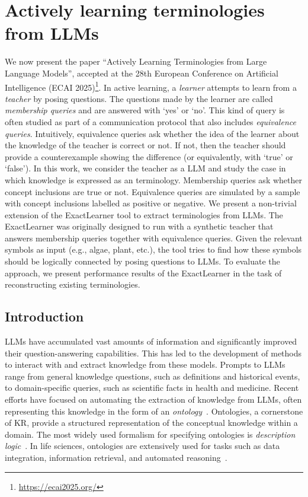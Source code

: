 \section{Actively learning \EL terminologies from \glspl{LLM}}\label{sec:actively-learning-ontologies}
%
We now present the paper ``Actively Learning \EL Terminologies from Large Language Models'', accepted at the 28th European Conference on Artificial Intelligence (ECAI 2025)\footnote{\url{https://ecai2025.org/}}.
%
In active learning, a \emph{learner} attempts to learn from a \emph{teacher} by posing questions.
%
The questions made by the learner are called \emph{membership queries} and are answered with `yes' or `no'.
%
This kind of query is often studied as part of a communication protocol that also includes \emph{equivalence queries}.
%
Intuitively, equivalence queries ask whether the idea of the learner about the knowledge of the teacher is correct or not.
%
If not, then the teacher should provide a counterexample showing the difference (or equivalently, with `true' or `false').
%
In this work, we consider the teacher as a \gls{LLM} and study the case in which knowledge is expressed as an \EL terminology.
%
Membership queries ask whether concept inclusions are true or not.
%
Equivalence queries are simulated by a sample with concept inclusions labelled as  positive or negative.
%
We present a non-trivial extension of the ExactLearner tool to extract \EL terminologies from \glspl{LLM}.
%
The ExactLearner was originally designed to run with a synthetic teacher that answers membership queries together with equivalence queries.
%
Given the relevant symbols as input (e.g., algae, plant, etc.), the tool tries to find how these symbols should be logically connected by posing questions to \glspl{LLM}.
%
To evaluate the approach, we present performance results of the ExactLearner in the task of reconstructing existing \EL terminologies.


\subsection{Introduction}
\label{subsec:actively-learning-introduction}
\glspl{LLM} have accumulated vast amounts of information and significantly improved their question-answering capabilities.
%
This has led to the development of methods to interact with and extract knowledge from these models.
%
Prompts to \glspl{LLM} range from general knowledge questions, such as definitions and historical events, to domain-specific queries, such as scientific facts in health and medicine.
%
Recent efforts have focused on automating the extraction of knowledge from \glspl{LLM}, often representing this knowledge in the form of an \emph{ontology}~\cite{10.1093/bioinformatics/btae104,DBLP:journals/kbs/CiattoAMO25,DBLP:conf/ekaw/DurantiGMRR24,funk2023ontology,DBLP:conf/ontobras/SoaresW24}.
%
Ontologies, a cornerstone of \gls{KR}, provide a structured representation of the conceptual knowledge within a domain.
%
The most widely used formalism for specifying ontologies is \emph{description logic}~\cite{DBLP:books/daglib/0041477}.
%
In life sciences, ontologies are extensively used for tasks such as data integration, information retrieval, and automated reasoning~\cite{DBLP:conf/semweb/NoySDDGJMRYM08}.

